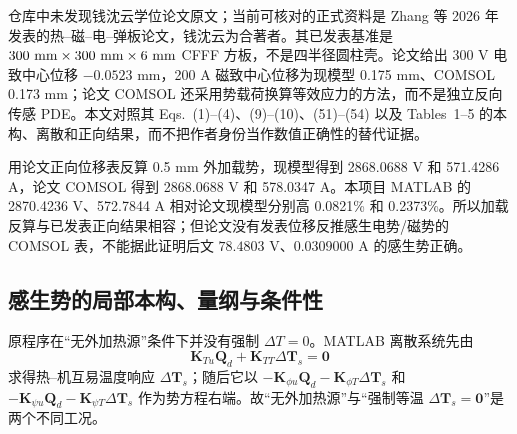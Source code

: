 \documentclass[UTF8,fontset=windows,11pt,a4paper]{ctexart}
\begin{document}
仓库中未发现钱沈云学位论文原文；当前可核对的正式资料是 Zhang 等 2026 年发表的热--磁--电--弹板论文，钱沈云为合著者。其已发表基准是 $300\ {\rm mm}\times300\ {\rm mm}\times6\ {\rm mm}$ CFFF 方板，不是四半径圆柱壳。论文给出 300 V 电致中心位移 $-0.0523$ mm，200 A 磁致中心位移为现模型 0.175 mm、COMSOL 0.173 mm；论文 COMSOL 还采用势载荷换算等效应力的方法，而不是独立反向传感 PDE。本文对照其 Eqs.~(1)--(4)、(9)--(10)、(51)--(54) 以及 Tables~1--5 的本构、离散和正向结果，而不把作者身份当作数值正确性的替代证据。

用论文正向位移表反算 0.5 mm 外加载势，现模型得到 2868.0688 V 和 571.4286 A，论文 COMSOL 得到 2868.0688 V 和 578.0347 A。本项目 MATLAB 的 2870.4236 V、572.7844 A 相对论文现模型分别高 0.0821\% 和 0.2373\%。所以加载反算与已发表正向结果相容；但论文没有发表位移反推感生电势/磁势的 COMSOL 表，不能据此证明后文 $78.4803$ V、$0.0309000$ A 的感生势正确。

\subsection{感生势的局部本构、量纲与条件性}

原程序在“无外加热源”条件下并没有强制 $\Delta T=0$。MATLAB 离散系统先由
\[
\mathbf K_{Tu}\mathbf Q_d+\mathbf K_{TT}\Delta\mathbf T_s=\mathbf0
\]
求得热--机互易温度响应 $\Delta\mathbf T_s$；随后它以
$-\mathbf K_{\phi u}\mathbf Q_d-\mathbf K_{\phi T}\Delta\mathbf T_s$ 和
$-\mathbf K_{\psi u}\mathbf Q_d-\mathbf K_{\psi T}\Delta\mathbf T_s$ 作为势方程右端。故“无外加热源”与“强制等温 $\Delta\mathbf T_s=\mathbf0$”是两个不同工况。
\end{document}
